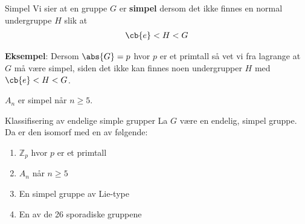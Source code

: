 \begin{definition}{Simpel}{}
  Vi sier at en gruppe $G$ er \textbf{simpel} dersom det ikke finnes en normal undergruppe $H$ 
  slik at 
  \begin{align}
    \cb{e}<H<G
  \end{align}
\end{definition}

\textbf{Eksempel}: Dersom $\abs{G}=p$ hvor $p$ er et primtall så vet vi fra lagrange at 
$G$ må være simpel, siden det ikke kan finnes noen undergrupper $H$ med $\cb{e}<H<G$. 

\begin{theorem*}{15.15}{}
 $A_n$ er simpel når $n\geq 5$. 
\end{theorem*}

\begin{theorem*}{Klassifisering av endelige simple grupper}{}
 La $G$ være en endelig, simpel gruppe. Da er den isomorf med en av følgende:
 \begin{enumerate}
   \item $\mathbb{Z}_p$ hvor $p$ er et primtall
   \item $A_n$ når $n\geq 5$
   \item En simpel gruppe av Lie-type
   \item En av de 26 sporadiske gruppene
 \end{enumerate}
\end{theorem*}
